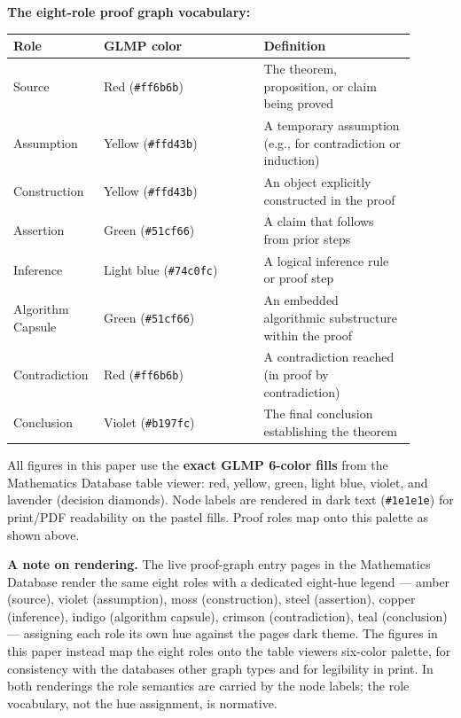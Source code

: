 \documentclass[
  11pt]{article}
\begin{document}
\textbf{The eight-role proof graph vocabulary:}

\begin{longtable}[]{@{}>{\raggedright\arraybackslash}p{0.16\linewidth}>{\raggedright\arraybackslash}p{0.38\linewidth}>{\raggedright\arraybackslash}p{0.36\linewidth}@{}}
\toprule\noalign{}
Role & GLMP color & Definition \\
\midrule\noalign{}
\endhead
\bottomrule\noalign{}
\endlastfoot
Source & Red (\texttt{\#ff6b6b}) & The theorem, proposition, or claim
being proved \\
Assumption & Yellow (\texttt{\#ffd43b}) & A temporary assumption (e.g.,
for contradiction or induction) \\
Construction & Yellow (\texttt{\#ffd43b}) & An object explicitly
constructed in the proof \\
Assertion & Green (\texttt{\#51cf66}) & A claim that follows from prior
steps \\
Inference & Light blue (\texttt{\#74c0fc}) & A logical inference rule or
proof step \\
Algorithm Capsule & Green (\texttt{\#51cf66}) & An embedded algorithmic
substructure within the proof \\
Contradiction & Red (\texttt{\#ff6b6b}) & A contradiction reached (in
proof by contradiction) \\
Conclusion & Violet (\texttt{\#b197fc}) & The final conclusion
establishing the theorem \\
\end{longtable}

All figures in this paper use the \textbf{exact GLMP 6-color fills} from
the Mathematics Database table viewer: red, yellow, green, light blue,
violet, and lavender (decision diamonds). Node labels are rendered in
dark text (\texttt{\#1e1e1e}) for print/PDF readability on the pastel
fills. Proof roles map onto this palette as shown above.

\textbf{A note on rendering.} The live proof-graph entry pages in the
Mathematics Database render the same eight roles with a dedicated
eight-hue legend --- amber (source), violet (assumption), moss
(construction), steel (assertion), copper (inference), indigo (algorithm
capsule), crimson (contradiction), teal (conclusion) --- assigning each
role its own hue against the pages\textquotesingle{} dark theme. The
figures in this paper instead map the eight roles onto the table
viewer\textquotesingle s six-color palette, for consistency with the
database\textquotesingle s other graph types and for legibility in
print. In both renderings the role semantics are carried by the node
labels; the role vocabulary, not the hue assignment, is normative.
\end{document}
